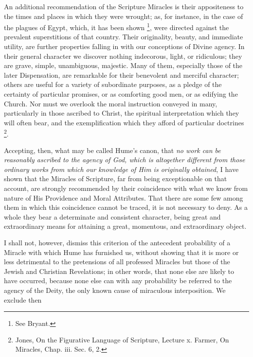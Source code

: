An additional recommendation of the Scripture
Miracles is their appositeness to the times and places in which they
were wrought; as, for instance, in the case of the plagues of Egypt,
which, it has been shown \footnote{See Bryant.}, were directed against the
prevalent superstitions of that country. Their originality, beauty,
and immediate utility, are further properties falling in with our
conceptions of Divine agency. In their general character we discover
nothing indecorous, light, or ridiculous; they are grave, simple,
unambiguous, majestic. Many of them, especially those of the later
Dispensation, are remarkable for their benevolent and merciful
character; others are useful for a variety of subordinate purposes, as
a pledge of the certainty of particular promises, or as comforting
good men, or as edifying the Church. Nor must we overlook the moral
instruction conveyed in many, particularly in those ascribed to
Christ, the spiritual interpretation which they will often bear, and
the exemplification which they afford of particular doctrines \footnote{Jones, On the Figurative Language of
Scripture, Lecture x. Farmer, On Miracles, Chap. iii. Sec. 6, 2.}.

Accepting, then, what may be called Hume's
canon, that \emph{no work can be reasonably ascribed to the agency of
God, which is altogether different from those ordinary works from
which our knowledge of Him is originally obtained}, I have shown
that the Miracles of Scripture, far from being exceptionable on that
account, are strongly recommended by their coincidence with what we
know from nature of His Providence and Moral Attributes. That there
are some few among them in which this coincidence cannot be traced, it
is not necessary to deny. As a whole they bear a determinate and
consistent character, being great and extraordinary means for
attaining a great, momentous, and extraordinary object.

I shall not, however, dismiss this criterion of
the antecedent probability of a Miracle with which Hume has furnished
us, without showing that it is more or less detrimental to the
pretensions of all professed Miracles but those of the Jewish and
Christian Revelations; in other words, that none else are likely to
have occurred, because none else can with any probability be referred
to the agency of the Deity, the only known cause of miraculous
interposition. We exclude then


